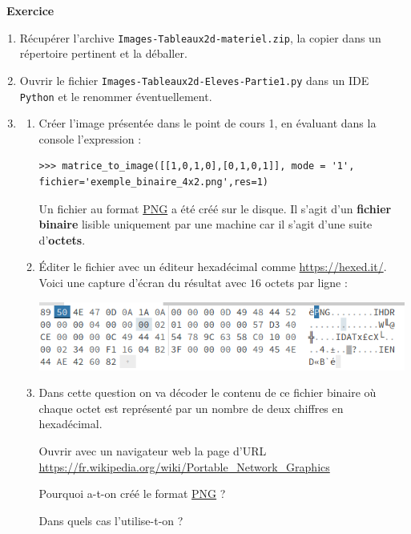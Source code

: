 \documentclass[a4paper, french, 12pt]{article}
\newcounter{exo}
\newenvironment{exercice}[1]
{\par \medskip   \addtocounter{exo}{1} \noindent  
\begin{bclogo}[arrondi =0.1,   noborder = true, logo=\bccrayon, marge=4]{~\textbf{Exercice} \textbf{\theexo} {\itshape #1} }  \par}
{
\end{bclogo}
 \par \bigskip }
\newcounter{cours}
\begin{document}
\vspace*{-20pt}


\begin{exercice}{}
\begin{enumerate}
	\item Récupérer l'archive  \texttt{Images-Tableaux2d-materiel.zip}, la copier dans un répertoire pertinent et la déballer.
	\item Ouvrir le fichier \texttt{Images-Tableaux2d-Eleves-Partie1.py} dans un IDE \texttt{Python} et le renommer éventuellement.
	\item 
\begin{enumerate}
\item Créer l'image présentée dans le point de cours 1, en évaluant dans la console l'expression :
\begin{lstlisting}[style=compil]
>>> matrice_to_image([[1,0,1,0],[0,1,0,1]], mode = '1', fichier='exemple_binaire_4x2.png',res=1)
\end{lstlisting}
Un fichier au format \href{https://fr.wikipedia.org/wiki/Portable_Network_Graphics}{PNG} a été créé sur le disque. Il s'agit d'un \textbf{fichier binaire}  lisible uniquement par une machine car il s'agit d'une suite d'\textbf{octets}.
\item Éditer le fichier avec un éditeur hexadécimal comme \href{https://hexed.it/}{https://hexed.it/}.  Voici une capture d'écran du résultat avec $16$ octets par ligne :

\begin{center}
\includegraphics[scale=0.8]{images/exemple_binaire_hex.png}
\end{center}


\item Dans cette question on va décoder le contenu de ce fichier binaire où chaque octet est représenté par un nombre de deux chiffres en hexadécimal.

Ouvrir avec un navigateur web la page d'URL \url{https://fr.wikipedia.org/wiki/Portable_Network_Graphics}

Pourquoi a-t-on créé le format \href{https://fr.wikipedia.org/wiki/Portable_Network_Graphics}{PNG}  ? 

Dans quels cas l'utilise-t-on ?


\end{enumerate}
\end{enumerate}
\end{exercice}
\end{document}
